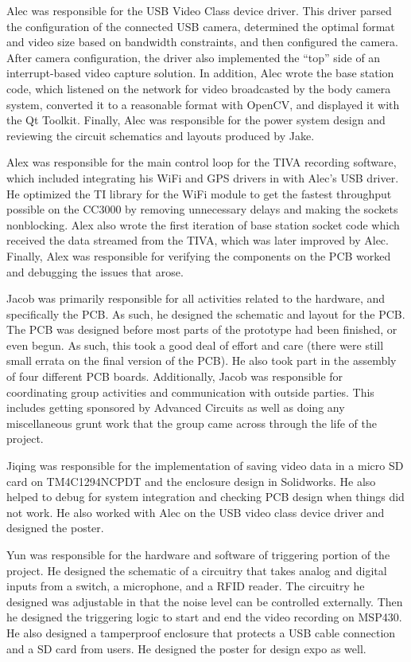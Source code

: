 \documentclass[12pt]{article}
\begin{document}
Alec was responsible for the USB Video Class device driver. This driver parsed
the configuration of the connected USB camera, determined the optimal format
and video size based on bandwidth constraints, and then configured the camera.
After camera configuration, the driver also implemented the “top” side of an
interrupt-based video capture solution. In addition, Alec wrote the base
station code, which listened on the network for video broadcasted by the body
camera system, converted it to a reasonable format with OpenCV, and displayed
it with the Qt Toolkit. Finally, Alec was responsible for the power system
design and reviewing the circuit schematics and layouts produced by Jake.

Alex was responsible for the main control loop for the TIVA recording software,
which included integrating his WiFi and GPS drivers in with Alec's USB driver.
He optimized the TI library for the WiFi module to get the fastest throughput
possible on the CC3000 by removing unnecessary delays and making the sockets
nonblocking. Alex also wrote the first iteration of base station socket code
which received the data streamed from the TIVA, which was later improved by
Alec. Finally, Alex was responsible for verifying the components on the PCB
worked and debugging the issues that arose.

Jacob was primarily responsible for all activities related to the hardware, and
specifically the PCB. As such, he designed the schematic and layout for the
PCB. The PCB was designed before most parts of the prototype had been finished,
or even begun. As such, this took a good deal of effort and care (there were
still small errata on the final version of the PCB). He also took part in the
assembly of four different PCB boards. Additionally, Jacob was responsible for
coordinating group activities and communication with outside parties. This
includes getting sponsored by Advanced Circuits as well as doing any
miscellaneous grunt work that the group came across through the life of the
project.

Jiqing was responsible for the implementation of saving video data in a micro
SD card on TM4C1294NCPDT and the enclosure design in Solidworks. He also helped
to debug for system integration and checking PCB design when things did not
work. He also worked with Alec on the USB video class device driver and
designed the poster.

Yun was responsible for the hardware and software of triggering portion of the
project. He designed the schematic of a circuitry that takes analog and digital
inputs from a switch, a microphone, and a RFID reader. The circuitry he
designed was adjustable in that the noise level can be controlled externally.
Then he designed the triggering logic to start and end the video recording on
MSP430. He also designed a tamperproof enclosure that protects a USB cable
connection and a SD card from users. He designed the poster for design expo as
well.
\end{document}
